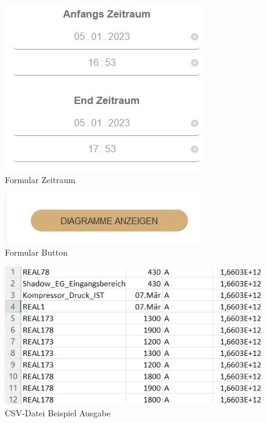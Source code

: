 \begin{figure}
    \centering
    \includegraphics[scale=1]{pics/FlexLoggerWebsiteFormulare_zeitraum.jpg}
    \caption{Formular Zeitraum}
    \label{fig:impl:FlexLoggerHauptseitenAnsichtZeitraum}
\end{figure}
 
\begin{figure}
    \centering
    \includegraphics[scale=1]{pics/FlexLoggerWebsiteFormulare_button.jpg}
    \caption{Formular Button}
    \label{fig:impl:FlexLoggerHauptseitenAnsichtButton}
\end{figure}
 
\begin{figure}
    \centering
    \includegraphics[scale=1]{pics/csv_datei_beispiel.jpg}
    \caption{CSV-Datei Beispiel Ausgabe}
    \label{fig:impl:FlexLoggerHauptseitenAnsichtCSV}
\end{figure}
 
